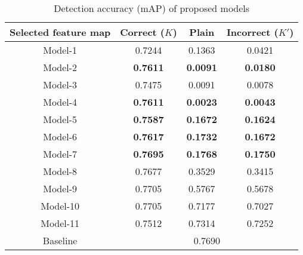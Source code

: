 \documentclass[conference,10pt,a4paper]{IEEEtran}
\begin{document}
\begin{table}[bt]
 \caption{Detection accuracy (mAP) of proposed models}
 \label{table:result}
 \centering
  \begin{tabular}{|c|ccc|}
   \hline
   Selected feature map  & Correct ($K$) & Plain & Incorrect ($K'$) \\
   \hline
   Model-1& 0.7244 & 0.1363 & 0.0421 \\
   Model-2& \textbf{0.7611} & \textbf{0.0091} & \textbf{0.0180} \\
   Model-3& 0.7475 & 0.0091 & 0.0078 \\
   Model-4& \textbf{0.7611} & \textbf{0.0023} & \textbf{0.0043} \\
   Model-5& \textbf{0.7587} & \textbf{0.1672} & \textbf{0.1624} \\
   Model-6& \textbf{0.7617} & \textbf{0.1732} & \textbf{0.1672} \\
   Model-7& \textbf{0.7695} & \textbf{0.1768} & \textbf{0.1750} \\
   Model-8& 0.7677 & 0.3529 & 0.3415\\
   Model-9& 0.7705 & 0.5767 & 0.5678 \\
   Model-10& 0.7705 & 0.7177 & 0.7027 \\
   Model-11& 0.7512 & 0.7314 & 0.7252 \\
   \hline
   Baseline& \multicolumn{3}{c|}{0.7690}\\
   \hline
  \end{tabular}
\end{table}
\end{document}
